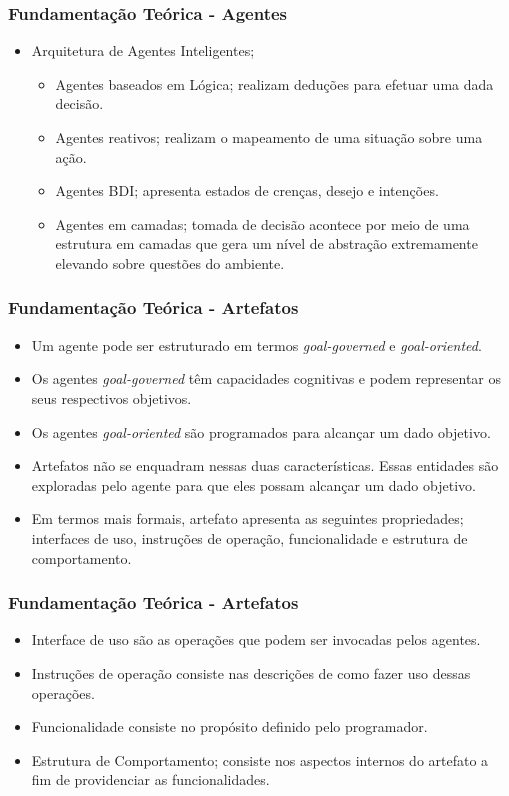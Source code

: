 \documentclass{beamer}
\begin{document}
\begin{frame}
\frametitle{Fundamentação Teórica - Agentes}
	\begin{itemize}
		\item Arquitetura de Agentes Inteligentes;
		\begin{itemize}
			\item Agentes baseados em Lógica; realizam deduções para efetuar uma dada decisão.
			\item Agentes reativos; realizam o mapeamento de uma situação sobre uma ação. 
			\item Agentes BDI; apresenta estados de crenças, desejo e intenções.
			\item Agentes em camadas; tomada de decisão acontece por meio de uma estrutura em camadas que gera um nível de abstração extremamente elevando sobre questões do ambiente. 
		\end{itemize}
	\end{itemize}
\end{frame}

\begin{frame}
\frametitle{Fundamentação Teórica - Artefatos}
	\begin{itemize}
		\item Um agente pode ser estruturado em termos \textit{goal-governed} e \textit{goal-oriented}.
		\item Os agentes \textit{goal-governed} têm capacidades cognitivas e podem representar os seus respectivos objetivos. 
		\item Os agentes \textit{goal-oriented} são programados para alcançar um dado objetivo. 
		\item Artefatos não se enquadram nessas duas características. Essas entidades são exploradas pelo agente para que eles possam alcançar um dado objetivo. 
		\item Em termos mais formais, artefato apresenta as seguintes propriedades; interfaces de uso, instruções de operação, funcionalidade e estrutura de comportamento. 
	\end{itemize}
\end{frame}

\begin{frame}
\frametitle{Fundamentação Teórica - Artefatos}
	\begin{itemize}
		\item Interface de uso são as operações que podem ser invocadas pelos agentes. 
		\item Instruções de operação consiste nas descrições de como fazer uso dessas operações.
		\item Funcionalidade consiste no propósito definido pelo programador. 
		\item Estrutura de Comportamento; consiste nos aspectos internos do artefato a fim de providenciar as funcionalidades. 
	\end{itemize}
\end{frame}
\end{document}
